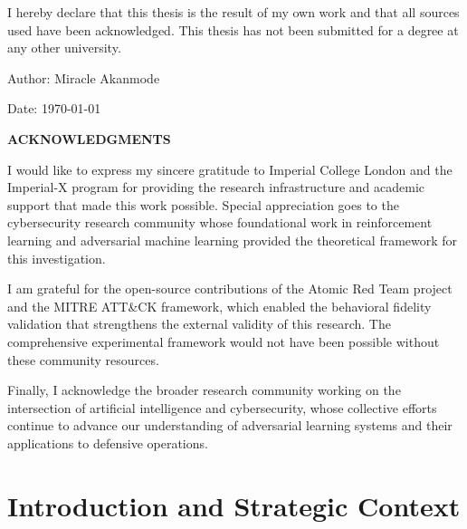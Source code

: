 \documentclass[12pt,twoside]{article}
\newcommand{\thesisauthor}{Miracle Akanmode}
\theoremstyle{definition}
\theoremstyle{plain}
\begin{document}
\vspace{1em}

I hereby declare that this thesis is the result of my own work and that all sources used have been acknowledged. This thesis has not been submitted for a degree at any other university.

\vspace{2em}

\noindent Author: \thesisauthor

\vspace{1em}

\noindent Date: \today

\clearpage

\begin{center}
\large\textbf{ACKNOWLEDGMENTS}
\end{center}

\vspace{1em}

I would like to express my sincere gratitude to Imperial College London and the Imperial-X program for providing the research infrastructure and academic support that made this work possible. Special appreciation goes to the cybersecurity research community whose foundational work in reinforcement learning and adversarial machine learning provided the theoretical framework for this investigation.

I am grateful for the open-source contributions of the Atomic Red Team project and the MITRE ATT\&CK framework, which enabled the behavioral fidelity validation that strengthens the external validity of this research. The comprehensive experimental framework would not have been possible without these community resources.

Finally, I acknowledge the broader research community working on the intersection of artificial intelligence and cybersecurity, whose collective efforts continue to advance our understanding of adversarial learning systems and their applications to defensive operations.

\clearpage

\listoffigures
\clearpage

\listoftables
\clearpage

\setcounter{page}{1}
\pagestyle{fancy}
\fancyhf{}
\fancyfoot[C]{\thepage}

\section{Introduction and Strategic Context}
\end{document}
